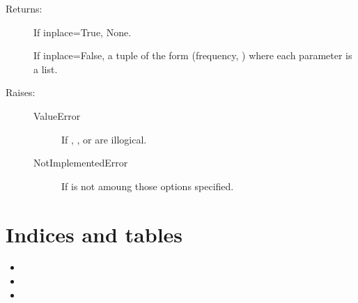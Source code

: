 \documentclass[letterpaper,10pt,english]{sphinxmanual}
\begin{document}
\begin{fulllineitems}
\begin{fulllineitems}
\begin{description}
\item[{Returns:}] \leavevmode
If inplace=True, None.

If inplace=False, a tuple of the form (frequency, ) where each parameter is a list.

\item[{Raises:}] \leavevmode\begin{description}
\item[{ValueError}] \leavevmode
If , , or  are illogical.

\item[{NotImplementedError}] \leavevmode
If  is not amoung those options specified.

\end{description}

\end{description}

\end{fulllineitems}


\end{fulllineitems}



\chapter{Indices and tables}
\label{\detokenize{index:indices-and-tables}}\begin{itemize}
\item {} 

\item {} 

\item {} 

\end{itemize}



\renewcommand{\indexname}{Index}
\printindex
\end{document}
